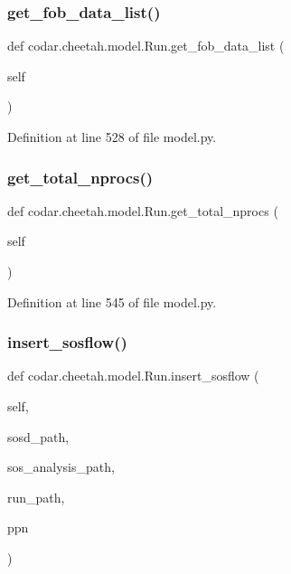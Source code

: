 \subsubsection{\texorpdfstring{get\+\_\+fob\+\_\+data\+\_\+list()}{get\_fob\_data\_list()}}
{\footnotesize\ttfamily def codar.\+cheetah.\+model.\+Run.\+get\+\_\+fob\+\_\+data\+\_\+list (\begin{DoxyParamCaption}\item[{}]{self }\end{DoxyParamCaption})}



Definition at line 528 of file model.\+py.

\mbox{\label{classcodar_1_1cheetah_1_1model_1_1_run_af56a27848d2d8b900435b462ac6b74d8}} 
\subsubsection{\texorpdfstring{get\+\_\+total\+\_\+nprocs()}{get\_total\_nprocs()}}
{\footnotesize\ttfamily def codar.\+cheetah.\+model.\+Run.\+get\+\_\+total\+\_\+nprocs (\begin{DoxyParamCaption}\item[{}]{self }\end{DoxyParamCaption})}



Definition at line 545 of file model.\+py.

\mbox{\label{classcodar_1_1cheetah_1_1model_1_1_run_a8f4284bf79f8b909c4c2d0ef5319e3bc}} 
\subsubsection{\texorpdfstring{insert\+\_\+sosflow()}{insert\_sosflow()}}
{\footnotesize\ttfamily def codar.\+cheetah.\+model.\+Run.\+insert\+\_\+sosflow (\begin{DoxyParamCaption}\item[{}]{self,  }\item[{}]{sosd\+\_\+path,  }\item[{}]{sos\+\_\+analysis\+\_\+path,  }\item[{}]{run\+\_\+path,  }\item[{}]{ppn }\end{DoxyParamCaption})}

